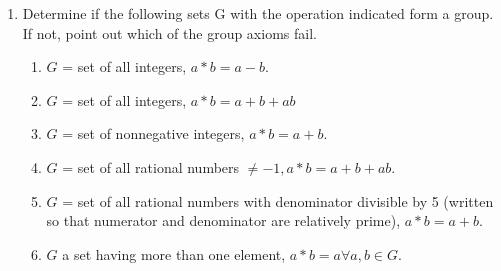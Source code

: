 \renewcommand{\theequation}{\theenumi}

\begin{enumerate}[label=\arabic*.,ref=\thesubsection.\theenumi]
	\item Determine if the following sets G with the operation indicated form a group. If not, point out which of the group axioms fail. 
\begin{enumerate}
	\item  $G$ = set of all integers, $a * b = a-b$. 
	\item  $G$ = set of all integers, $a * b = a + b + ab $
	\item  $G$ = set of nonnegative integers, $a * b = a + b$. 
	\item  $G$ = set of all rational numbers $\ne  -1, a * b = a + b + ab $.
	\item  $G$ = set of all rational numbers with denominator divisible by 5 (written so that numerator and denominator are relatively prime), $a * b = a + b$.
	\item  $G$ a set having more than one element, $a * b = a \forall a, b \in G$.


\end{enumerate}
\end{enumerate}
